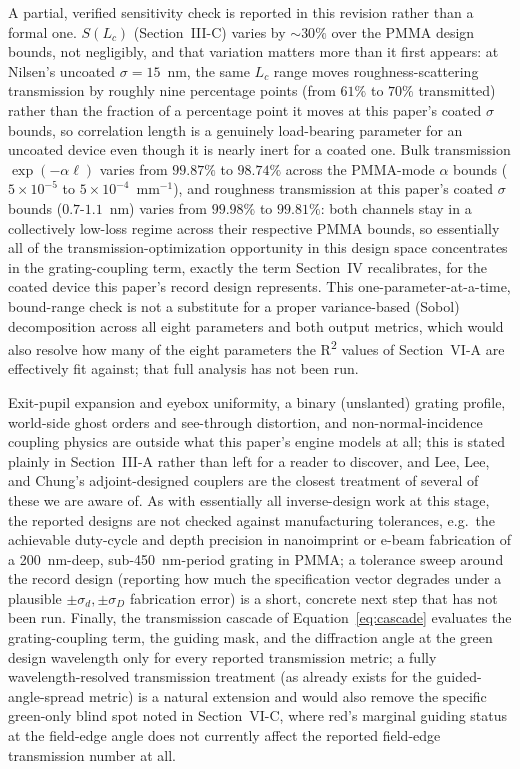 \documentclass[10pt,twocolumn]{article}
\begin{document}
A partial, verified sensitivity check is reported in this revision rather
than a formal one. $S(L_c)$ (Section~III-C) varies by $\sim30\%$ over the
PMMA design bounds, not negligibly, and that variation matters more than
it first appears: at Nilsen's uncoated $\sigma=15$~nm, the same $L_c$
range moves roughness-scattering transmission by roughly nine percentage
points (from $61\%$ to $70\%$ transmitted) rather than the fraction of a
percentage point it moves at this paper's coated $\sigma$ bounds, so
correlation length is a genuinely load-bearing parameter for an uncoated
device even though it is nearly inert for a coated one. Bulk transmission
$\exp(-\alpha\ell)$ varies from $99.87\%$ to $98.74\%$ across the
PMMA-mode $\alpha$ bounds ($5\times10^{-5}$ to $5\times10^{-4}$~mm$^{-1}$),
and roughness transmission at this paper's coated $\sigma$ bounds
($0.7$-$1.1$~nm) varies from $99.98\%$ to $99.81\%$: both channels stay in
a collectively low-loss regime across their respective PMMA bounds, so
essentially all of the transmission-optimization opportunity in this
design space concentrates in the grating-coupling term, exactly the term
Section~IV recalibrates, for the coated device this paper's record design
represents. This one-parameter-at-a-time, bound-range check is not a
substitute for a proper variance-based (Sobol) decomposition across all
eight parameters and both output metrics, which would also resolve how
many of the eight parameters the R\textsuperscript{2} values of
Section~VI-A are effectively fit against; that full analysis has not been
run.

Exit-pupil expansion and eyebox uniformity, a binary (unslanted) grating
profile, world-side ghost orders and see-through distortion, and
non-normal-incidence coupling physics are outside what this paper's
engine models at all; this is stated plainly in Section~III-A rather than
left for a reader to discover, and Lee, Lee, and Chung's adjoint-designed
couplers \cite{lee2025nanophotonics} are the closest treatment of several
of these we are aware of. As with essentially all inverse-design work at
this stage, the reported designs are not checked against manufacturing
tolerances, e.g.\ the achievable duty-cycle and depth precision in
nanoimprint or e-beam fabrication of a 200~nm-deep, sub-450~nm-period
grating in PMMA; a tolerance sweep around the record design (reporting how
much the specification vector degrades under a plausible
$\pm\sigma_d,\pm\sigma_D$ fabrication error) is a short, concrete next
step that has not been run. Finally, the transmission cascade of
Equation~\eqref{eq:cascade} evaluates the grating-coupling term, the
guiding mask, and the diffraction angle at the green design wavelength
only for every reported transmission metric; a fully wavelength-resolved
transmission treatment (as already exists for the guided-angle-spread
metric) is a natural extension and would also remove the specific
green-only blind spot noted in Section~VI-C, where red's marginal guiding
status at the field-edge angle does not currently affect the reported
field-edge transmission number at all.
\end{document}
